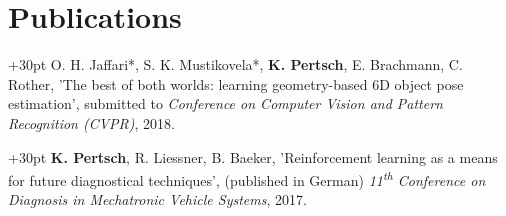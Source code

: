 \documentclass[letterpaper,11pt]{article}
\begin{document}
\section{Publications}
\hangindent+30pt 
O. H. Jaffari*, S. K. Mustikovela*, \textbf{K. Pertsch}, E. Brachmann, C. Rother, 'The best of both worlds: learning geometry-based 6D object pose estimation', submitted to \textit{Conference on Computer Vision and Pattern Recognition (CVPR)}, 2018.

\hangindent+30pt 
\textbf{K. Pertsch}, R. Liessner, B. Baeker, 'Reinforcement learning as a means for future diagnostical techniques',\hspace{2cm} (published in German) \textit{11\textsuperscript{th} Conference on Diagnosis in Mechatronic Vehicle Systems}, 2017.


\end{document}
